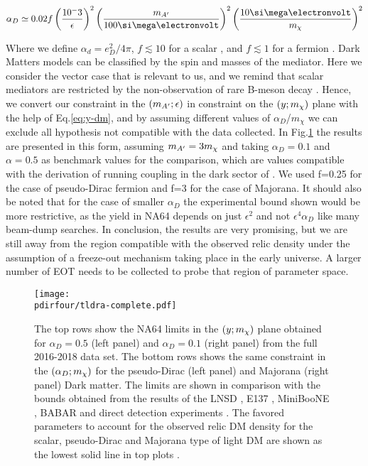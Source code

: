 \begin{equation}
  \label{eq:ad-freeze-out}
  \alpha_D \simeq 0.02 f\left(\frac{10^-3}{\epsilon}\right)^2\left(\frac{m_{\DM}}{100 \mev}\right)^2\left(\frac{10 \mev}{m_{\chi}}\right)^2
\end{equation}

Where we define $\alpha_d = e^2_D/4\pi$, $f\lesssim 10$ for a scalar \cite{deNiverville:2011it}, and $f\lesssim 1$ for a fermion \cite{PhysRevD.91.094026}. Dark Matters models can be classified by the spin and masses of the mediator. Here we consider the vector case that is relevant to us, and we remind that scalar mediators are restricted by the non-observation of rare B-meson decay \cite{battaglieri2017cosmic}. Hence, we convert our constraint in the $(m_{A'};\epsilon)$ in constraint on the $(y;m_{\chi})$ plane with the help of Eq.\ref{eq:y-dm}, and by assuming different values of $\alpha_D$/$m_{\chi}$ we can exclude all hypothesis not compatible with the data collected. In Fig.\ref{fig:dm-alpha-excl} the results are presented in this form, assuming $m_{A'} = 3m_{\chi}$ and taking $\alpha_D=0.1$ and $\alpha=0.5$ as benchmark values for the comparison, which are values compatible with the derivation of running coupling in the dark sector of \cite{Davoudiasl:2015hxa}. We used f=0.25 for the case of pseudo-Dirac fermion and f=3 for the case of Majorana. It should also be noted that for the case of smaller $\alpha_D$ the experimental bound shown would be more restrictive, as the yield in NA64 depends on just $\epsilon^2$ and not $\epsilon^4 \alpha_D$ like many beam-dump searches. In conclusion, the results are very promising, but we are still away from the region compatible with the observed relic density under the assumption of a freeze-out mechanism taking place in the early universe. A larger number of EOT needs to be collected to probe that region of parameter space.

\begin{figure}[bth!]
  \centering
  \texttt{[image: \\pdirfour/tldra-complete.pdf]}
  \caption{The top rows show the NA64 limits in the $(y;m_{\chi})$ plane obtained for $\alpha_D = 0.5$ (left panel) and $\alpha_D = 0.1$ (right panel) from the full 2016-2018 data set. The bottom rows shows the same constraint in the $(\alpha_D;m_{\chi})$ for the pseudo-Dirac (left panel) and Majorana (right panel) Dark matter. The limits are shown in comparison with the bounds obtained from the results of the LNSD \cite{deNiverville:2011it}, E137 \cite{e137}, MiniBooNE \cite{Aguilar-Arevalo:2018wea}, BABAR \cite{babar1} and direct detection experiments \cite{Essig:2012yx}. The favored parameters to account for the observed relic DM density for the scalar, pseudo-Dirac and Majorana type of light DM are shown as the lowest solid line in top plots \cite{Berlin:2018bsc}.}
  \label{fig:dm-alpha-excl}
\end{figure}
